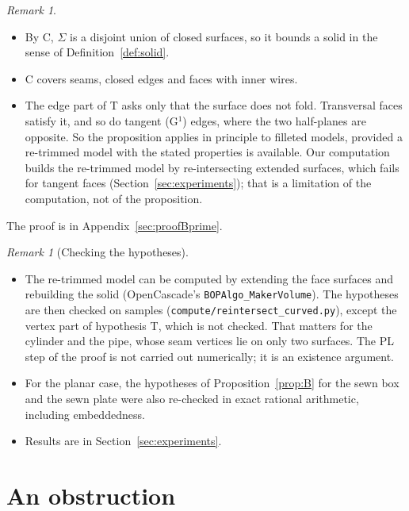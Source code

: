 \documentclass[preprint,12pt]{elsarticle}
\theoremstyle{definition}
\theoremstyle{remark}
\newtheorem{remark}[theorem]{Remark}
\begin{document}
\begin{remark}
\begin{itemize}
\item By C, $\Sigma$ is a disjoint union of closed surfaces, so it bounds a solid in the sense of
Definition~\ref{def:solid}.
\item C covers seams, closed edges and faces with inner wires.
\item The edge part of T asks only that the surface does not fold. Transversal faces satisfy it, and so do tangent (G$^1$)
edges, where the two half-planes are opposite. So the proposition applies in principle to filleted models, provided a
re-trimmed model with the stated properties is available. Our computation builds the re-trimmed model by
re-intersecting extended surfaces, which fails for tangent faces (Section~\ref{sec:experiments}); that is a limitation
of the computation, not of the proposition.
\end{itemize}
\end{remark}
The proof is in Appendix~\ref{sec:proofBprime}.

\begin{remark}[Checking the hypotheses]
\begin{itemize}
\item The re-trimmed model can be computed by extending the face surfaces and rebuilding the solid
(OpenCascade's \texttt{BOPAlgo\_MakerVolume}). The hypotheses are then checked on samples
(\texttt{compute/reintersect\_curved.py}), except the vertex part of hypothesis T, which is not
checked. That matters for the cylinder and the pipe, whose seam vertices lie on only two surfaces. The PL step of the
proof is not carried out numerically; it is an existence argument.
\item For the planar case, the hypotheses of Proposition~\ref{prop:B} for the sewn box and the sewn plate were also
re-checked in exact rational arithmetic, including embeddedness.
\item Results are in Section~\ref{sec:experiments}.
\end{itemize}
\end{remark}

\section{An obstruction}\label{sec:obstruction}
\end{document}
